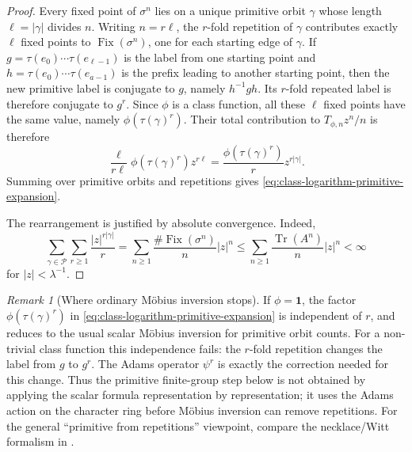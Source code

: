 \documentclass[11pt,a4paper]{amsart}
\theoremstyle{plain}
\theoremstyle{definition}
\theoremstyle{remark}
\newtheorem{remark}[theorem]{Remark}
\DeclareMathOperator{\Tr}{Tr}
\newcommand{\cP}{\mathcal P}
\begin{document}
\begin{proof}
  Every fixed point of \(\sigma^n\) lies on a unique primitive orbit
  \(\gamma\) whose length \(\ell=|\gamma|\) divides \(n\). Writing
  \(n=r\ell\), the \(r\)-fold repetition of \(\gamma\) contributes
  exactly \(\ell\) fixed points to \(\operatorname{Fix}(\sigma^n)\), one
  for each starting edge of \(\gamma\). If
  \(g=\tau(e_0)\cdots\tau(e_{\ell-1})\) is the label from one starting
  point and \(h=\tau(e_0)\cdots\tau(e_{a-1})\) is the prefix leading to
  another starting point, then the new primitive label is conjugate to
  \(g\), namely \(h^{-1}gh\). Its \(r\)-fold repeated label is therefore
  conjugate to \(g^r\). Since \(\phi\) is a class function, all these
  \(\ell\) fixed points have the same value, namely
  \(\phi(\tau(\gamma)^r)\). Their total contribution to
  \(T_{\phi,n}z^n/n\) is therefore
  \[
    \frac{\ell}{r\ell}\phi(\tau(\gamma)^r)z^{r\ell}
    =
    \frac{\phi(\tau(\gamma)^r)}{r}z^{r|\gamma|}.
  \]
  Summing over primitive orbits and repetitions gives
  \eqref{eq:class-logarithm-primitive-expansion}.

  The rearrangement is justified by absolute convergence. Indeed,
  \[
    \sum_{\gamma\in\cP}\sum_{r\ge 1}
      \frac{|z|^{r|\gamma|}}{r}
    =
    \sum_{n\ge 1}\frac{\#\operatorname{Fix}(\sigma^n)}{n}|z|^n
    \le
    \sum_{n\ge 1}\frac{\Tr(A^n)}{n}|z|^n
    <\infty
  \]
  for \(|z|<\lambda^{-1}\).
\end{proof}

\begin{remark}[Where ordinary M\"obius inversion stops]
  \label{rem:ordinary-mobius-stops}
  If \(\phi=\mathbf 1\), the factor
  \(\phi(\tau(\gamma)^r)\) in
  \eqref{eq:class-logarithm-primitive-expansion} is independent of
  \(r\), and  reduces to the
  usual scalar M\"obius inversion for primitive orbit counts. For a
  non-trivial class function this independence fails: the \(r\)-fold
  repetition changes the label from \(g\) to \(g^r\). The Adams operator
  \(\psi^r\) is exactly the correction needed for this change. Thus the
  primitive finite-group step below is not obtained by applying the
  scalar formula representation by representation; it uses the Adams
  action on the character ring before M\"obius inversion can remove
  repetitions. For the general ``primitive from repetitions'' viewpoint,
  compare the necklace/Witt formalism in
  \cite{MetropolisRota1983Necklaces,Wehrhahn1990AperiodicRings}.
\end{remark}
\end{document}
